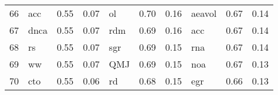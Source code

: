 \documentclass[12pt]{article}
\begin{document}
\begin{landscape}
\begin{footnotesize}
\begin{longtable}{l|lcc|lcc|lcc}
			66                    & acc                         & 0.55                                                                                 & 0.07                            & ol                          & 0.70                                                                                 & 0.16                            & aeavol                      & 0.67                                                                                 & 0.14                           \\
			67                    & dnca                        & 0.55                                                                                 & 0.07                            & rdm                         & 0.69                                                                                 & 0.16                            & acc                         & 0.67                                                                                 & 0.14                           \\
			68                    & rs                          & 0.55                                                                                 & 0.07                            & sgr                         & 0.69                                                                                 & 0.15                            & rna                         & 0.67                                                                                 & 0.14                           \\
			69                    & ww                          & 0.55                                                                                 & 0.07                            & QMJ                         & 0.69                                                                                 & 0.15                            & noa                         & 0.67                                                                                 & 0.13                           \\
			70                    & cto                         & 0.55                                                                                 & 0.06                            & rd                          & 0.68                                                                                 & 0.15                            & egr                         & 0.66                                                                                 & 0.13                           \\

\end{longtable}
\end{footnotesize}
\end{landscape}
\end{document}
